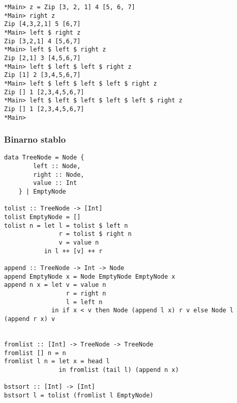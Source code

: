 \documentclass{beamer}
\begin{document}
\begin{frame}[fragile]
\begin{lstlisting}
*Main> z = Zip [3, 2, 1] 4 [5, 6, 7]
*Main> right z 
Zip [4,3,2,1] 5 [6,7]
*Main> left $ right z 
Zip [3,2,1] 4 [5,6,7]
*Main> left $ left $ right z 
Zip [2,1] 3 [4,5,6,7]
*Main> left $ left $ left $ right z 
Zip [1] 2 [3,4,5,6,7]
*Main> left $ left $ left $ left $ right z 
Zip [] 1 [2,3,4,5,6,7]
*Main> left $ left $ left $ left $ left $ right z 
Zip [] 1 [2,3,4,5,6,7]
*Main> 
\end{lstlisting}
\end{frame}


\begin{frame}[fragile]
\frametitle{Binarno stablo}
\begin{lstlisting}
data TreeNode = Node {
        left :: Node,
        right :: Node,
        value :: Int
    } | EmptyNode

tolist :: TreeNode -> [Int]
tolist EmptyNode = []
tolist n = let l = tolist $ left n
               r = tolist $ right n
               v = value n
           in l ++ [v] ++ r

append :: TreeNode -> Int -> Node
append EmptyNode x = Node EmptyNode EmptyNode x
append n x = let v = value n
                 r = right n
                 l = left n
             in if x < v then Node (append l x) r v else Node l (append r x) v


fromlist :: [Int] -> TreeNode -> TreeNode
fromlist [] n = n
fromlist l n = let x = head l
               in fromlist (tail l) (append n x)

bstsort :: [Int] -> [Int]
bstsort l = tolist (fromlist l EmptyNode)
\end{lstlisting}
\end{frame}
\end{document}
